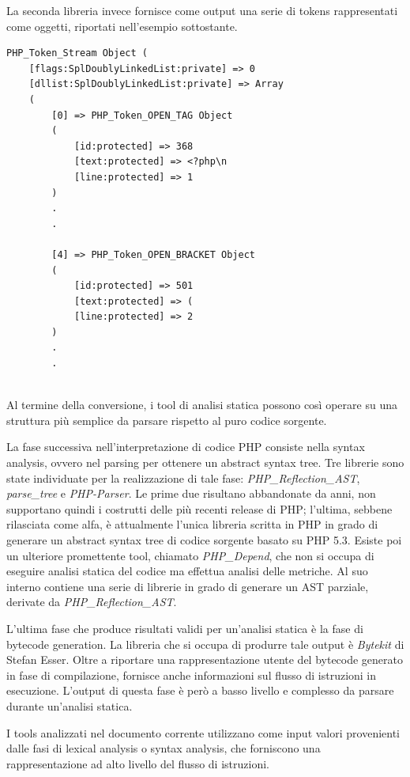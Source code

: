 La seconda libreria invece fornisce come output una serie di tokens rappresentati come oggetti, riportati nell'esempio sottostante.\\

\begin{lstlisting}
PHP_Token_Stream Object (
	[flags:SplDoublyLinkedList:private] => 0 
	[dllist:SplDoublyLinkedList:private] => Array
	(
		[0] => PHP_Token_OPEN_TAG Object 
		(
			[id:protected] => 368
			[text:protected] => <?php\n
			[line:protected] => 1
		)
		.
		.
		
		[4] => PHP_Token_OPEN_BRACKET Object 
		(
			[id:protected] => 501
			[text:protected] => (
			[line:protected] => 2
		)
		.
		.
		
\end{lstlisting}

Al termine della conversione, i tool di analisi statica possono così operare su una struttura più semplice da parsare rispetto al puro codice sorgente.

La fase successiva nell'interpretazione di codice PHP consiste nella syntax analysis, ovvero nel parsing per ottenere un abstract syntax tree. Tre librerie sono state individuate per la realizzazione di tale fase: \emph{PHP\_Reflection\_AST}, \emph{parse\_tree}\cite{parsetree} e \emph{PHP-Parser}\cite{phpparser}. Le prime due risultano abbandonate da anni, non supportano quindi i costrutti delle più recenti release di PHP; l'ultima, sebbene rilasciata come alfa, è attualmente l'unica libreria scritta in PHP in grado di generare un abstract syntax tree di codice sorgente basato su PHP 5.3. Esiste poi un ulteriore promettente tool, chiamato \emph{PHP\_Depend}\cite{phpdepend}, che non si occupa di eseguire analisi statica del codice ma effettua analisi delle metriche. Al suo interno contiene una serie di librerie in grado di generare un AST parziale, derivate da \emph{PHP\_Reflection\_AST}.

L'ultima fase che produce risultati validi per un'analisi statica è la fase di bytecode generation. La libreria che si occupa di produrre tale output è \emph{Bytekit}\cite{bytekit} di Stefan Esser. Oltre a riportare una rappresentazione utente del bytecode generato in fase di compilazione, fornisce anche informazioni sul flusso di istruzioni in esecuzione. L'output di questa fase è però a basso livello e complesso da parsare durante un'analisi statica.

I tools analizzati nel documento corrente utilizzano come input valori provenienti dalle fasi di lexical analysis o syntax analysis, che forniscono una rappresentazione ad alto livello del flusso di istruzioni.